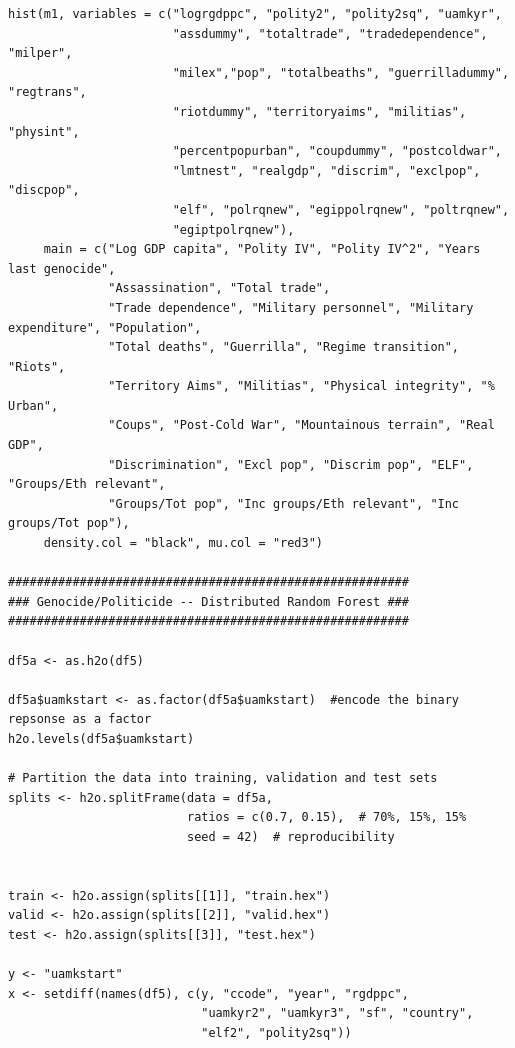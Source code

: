 \documentclass[a4paper,12pt]{article}
\begin{document}
\begin{verbatim}
hist(m1, variables = c("logrgdppc", "polity2", "polity2sq", "uamkyr",
                       "assdummy", "totaltrade", "tradedependence", "milper",
                       "milex","pop", "totalbeaths", "guerrilladummy", "regtrans",
                       "riotdummy", "territoryaims", "militias", "physint",
                       "percentpopurban", "coupdummy", "postcoldwar",
                       "lmtnest", "realgdp", "discrim", "exclpop", "discpop",
                       "elf", "polrqnew", "egippolrqnew", "poltrqnew",
                       "egiptpolrqnew"),
     main = c("Log GDP capita", "Polity IV", "Polity IV^2", "Years last genocide",
              "Assassination", "Total trade", 
              "Trade dependence", "Military personnel", "Military expenditure", "Population", 
              "Total deaths", "Guerrilla", "Regime transition", "Riots",
              "Territory Aims", "Militias", "Physical integrity", "% Urban",
              "Coups", "Post-Cold War", "Mountainous terrain", "Real GDP",
              "Discrimination", "Excl pop", "Discrim pop", "ELF", "Groups/Eth relevant", 
              "Groups/Tot pop", "Inc groups/Eth relevant", "Inc groups/Tot pop"),
     density.col = "black", mu.col = "red3")
     
########################################################
### Genocide/Politicide -- Distributed Random Forest ###
########################################################

df5a <- as.h2o(df5)

df5a$uamkstart <- as.factor(df5a$uamkstart)  #encode the binary repsonse as a factor
h2o.levels(df5a$uamkstart)

# Partition the data into training, validation and test sets
splits <- h2o.splitFrame(data = df5a, 
                         ratios = c(0.7, 0.15),  # 70%, 15%, 15%
                         seed = 42)  # reproducibility


train <- h2o.assign(splits[[1]], "train.hex")   
valid <- h2o.assign(splits[[2]], "valid.hex") 
test <- h2o.assign(splits[[3]], "test.hex")

y <- "uamkstart"
x <- setdiff(names(df5), c(y, "ccode", "year", "rgdppc",
                           "uamkyr2", "uamkyr3", "sf", "country",
                           "elf2", "polity2sq")) 


\end{verbatim}
\end{document}
